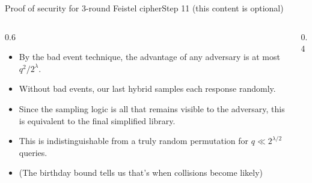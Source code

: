 \ifdefined\PRESENTATION\else\PassOptionsToClass{handout}{beamer}\fi\documentclass[aspectratio=169, lualatex]{beamer}
\begin{document}
	\begin{frame}{Proof of security for 3-round Feistel cipher}{Step 11  (this content is optional)}
		\begin{columns}[c]
			\begin{column}{0.6\textwidth}
				\begin{itemize}
					\item By the bad event technique, the advantage of any adversary is at most $q^2/2^{\lambda}$.
					\item Without bad events, our last hybrid samples each response randomly.
					\item Since the sampling logic is all that remains visible to the adversary, this is equivalent to the final simplified library.
					\item This is indistinguishable from a truly random permutation for $q \ll 2^{\lambda/2}$ queries.
					\item (The birthday bound tells us that's when collisions become likely)
				\end{itemize}
			\end{column}
			\begin{column}{0.4\textwidth}
				\vspace{-1.5cm}
				\begin{center}
				\end{center}
			\end{column}
		\end{columns}
	\end{frame}
\end{document}
